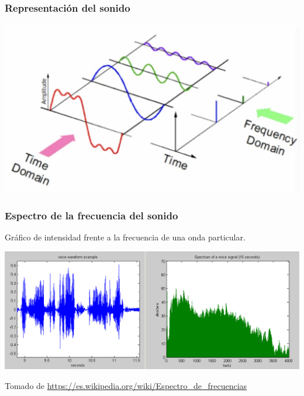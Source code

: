 \documentclass[
10pt, %
aspectratio=169, %
]{beamer}
\begin{document}
	\begin{frame}
		
		\frametitle{Representación del sonido}
		
		\centering
		\includegraphics[scale=0.5]{representacion.png}
		
		
	\end{frame}
	
	\begin{frame}
		
		\frametitle{Espectro de la frecuencia del sonido}
		
		
		\begin{alertblock}{}
			Gráfico de intensidad frente a la frecuencia de una onda particular.
		\end{alertblock}
		
		\vspace{1\baselineskip}
		\centering
		\includegraphics[scale=0.37]{spectrum.png}
		
		{\scriptsize Tomado de \url{https://es.wikipedia.org/wiki/Espectro_de_frecuencias}}
		
		
	\end{frame}
	
\end{document}
